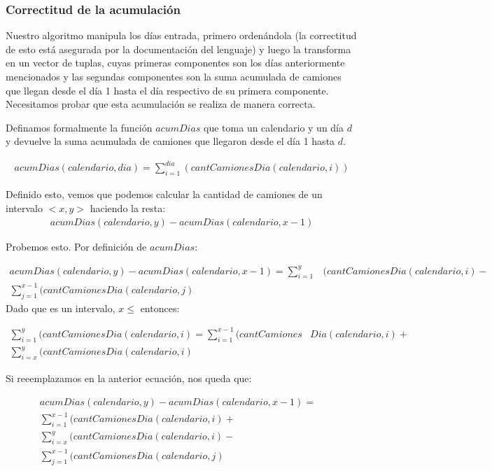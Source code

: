 \subsubsection{Correctitud de la acumulaci\'on}

Nuestro algoritmo manipula los d\'ias entrada, primero orden\'andola (la correctitud de esto est\'a asegurada por la documentaci\'on del lenguaje) y luego la transforma en un vector de tuplas, cuyas primeras componentes son los d\'ias anteriormente mencionados y las segundas componentes son la suma acumulada de camiones que llegan desde el d\'ia 1 hasta el d\'ia respectivo de su primera componente. Necesitamos probar que esta acumulaci\'on se realiza de manera correcta.

 \vspace{2mm}

Definamos formalmente la funci\'on $acumDias$ que toma un calendario y un d\'ia $d$ y devuelve la suma acumulada de camiones que llegaron desde el d\'ia 1 hasta $d$.

\begin{align*}
acumDias(calendario, dia) = \sum_{i=1}^{dia}(cantCamionesDia(calendario, i))
\end{align*}


Definido esto, vemos que podemos calcular la cantidad de camiones de un intervalo $<x, y>$ haciendo la resta:
\begin{align*}
acumDias(calendario, y) - acumDias(calendario, x-1)
\end{align*}

Probemos esto. Por definici\'on de $acumDias$:

\begin{align*}
 acumDias(calendario, y) -  acumDias(calendario,  x-1) =  \sum_{i=1}^{y}&(cantCamionesDia(calendario, i) -\\ \sum_{j=1}^{x-1}(cantCamionesDia(calendario, j)
\end{align*}
		Dado que es un intervalo, $ x \leq $ entonces:

\begin{align*}
\sum_{i=1}^{y}(cantCamionesDia(calendario, i) = \sum_{i=1}^{x-1}(cantCamiones&Dia(calendario, i) + \\ \sum_{i=x}^{y}(cantCamionesDia(calendario, i)
\end{align*}


 Si reeemplazamos en la anterior ecuaci\'on, nos queda que:


\begin{align*}
 acumDias(calendario, y) -  acumDias(calendario, x-1) = &\\  \sum_{i=1}^{x-1}(cantCamionesDia(calendario, i) + \\ \sum_{i=x}^{y}(cantCamionesDia(calendario, i)  - \\\sum_{j=1}^{x-1}(cantCamionesDia(calendario, j)
\end{align*}


